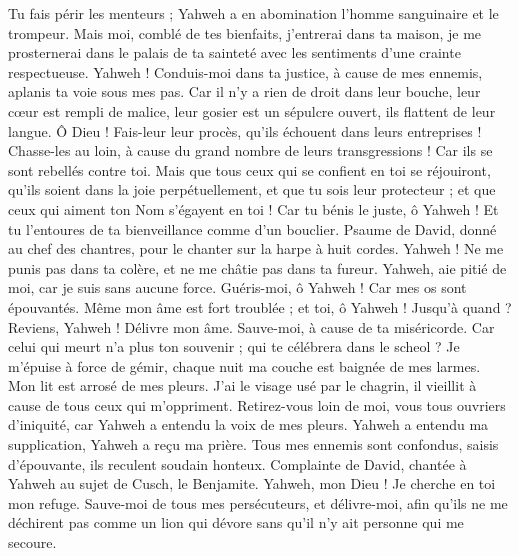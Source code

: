 \begin{multicols}{2}
Tu fais périr les menteurs ; Yahweh a en abomination l'homme sanguinaire et le trompeur.
Mais moi, comblé de tes bienfaits, j'entrerai dans ta maison, je me prosternerai dans le palais de ta sainteté avec les sentiments d’une crainte respectueuse.
Yahweh ! Conduis-moi dans ta justice, à cause de mes ennemis, aplanis ta voie sous mes pas.
Car il n'y a rien de droit dans leur bouche, leur cœur est rempli de malice, leur gosier est un sépulcre ouvert, ils flattent de leur langue.
Ô Dieu ! Fais-leur leur procès, qu'ils échouent dans leurs entreprises ! Chasse-les au loin, à cause du grand nombre de leurs transgressions ! Car ils se sont rebellés contre toi.
Mais que tous ceux qui se confient en toi se réjouiront, qu’ils soient dans la joie perpétuellement, et que tu sois leur protecteur ; et que ceux qui aiment ton Nom s’égayent en toi !
Car tu bénis le juste, ô Yahweh ! Et tu l'entoures de ta bienveillance comme d’un bouclier.
\VerseOne{}Psaume de David, donné au chef des chantres, pour le chanter sur la harpe à huit cordes.
Yahweh ! Ne me punis pas dans ta colère, et ne me châtie pas dans ta fureur.
Yahweh, aie pitié de moi, car je suis sans aucune force. Guéris-moi, ô Yahweh ! Car mes os sont épouvantés.
Même mon âme est fort troublée ; et toi, ô Yahweh ! Jusqu’à quand ?
Reviens, Yahweh ! Délivre mon âme. Sauve-moi, à cause de ta miséricorde.
Car celui qui meurt n’a plus ton souvenir ; qui te célébrera dans le scheol ?
Je m’épuise à force de gémir, chaque nuit ma couche est baignée de mes larmes. Mon lit est arrosé de mes pleurs.
J’ai le visage usé par le chagrin, il vieillit à cause de tous ceux qui m’oppriment.
Retirez-vous loin de moi, vous tous ouvriers d'iniquité, car Yahweh a entendu la voix de mes pleurs.
Yahweh a entendu ma supplication, Yahweh a reçu ma prière.
Tous mes ennemis sont confondus, saisis d’épouvante, ils reculent soudain honteux.
\VerseOne{}Complainte de David, chantée à Yahweh au sujet de Cusch, le Benjamite.
Yahweh, mon Dieu ! Je cherche en toi mon refuge. Sauve-moi de tous mes persécuteurs, et délivre-moi,
afin qu'ils ne me déchirent pas comme un lion qui dévore sans qu'il n’y ait personne qui me secoure.

\end{multicols}
